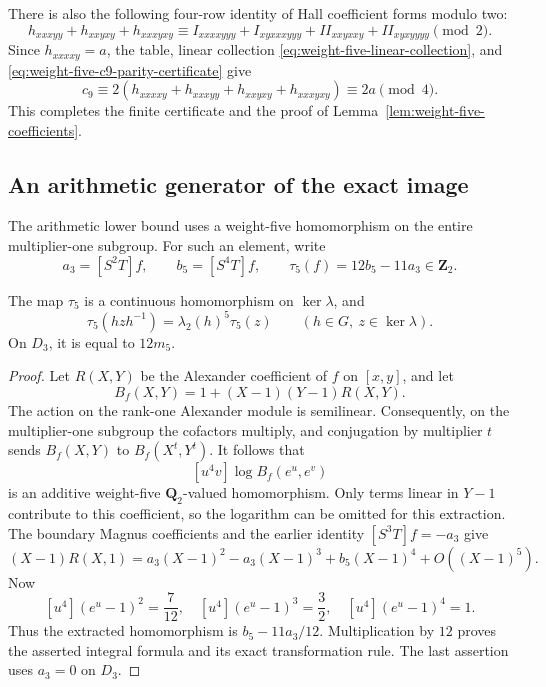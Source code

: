 There is also the following four-row identity of Hall coefficient
forms modulo two:
\begin{equation}\label{eq:weight-five-c9-parity-certificate}
 h_{xxxyy}+h_{xxyxy}+h_{xxxyxy}
 \equiv I_{xxxxyyy}+I_{xyxxxyyy}+II_{xxyxxy}+II_{xyxyyyy}
 \pmod2.
\end{equation}
Since $h_{xxxxy}=a$, the table, linear collection
\eqref{eq:weight-five-linear-collection}, and
\eqref{eq:weight-five-c9-parity-certificate} give
\[
 c_9\equiv
 2(h_{xxxxy}+h_{xxxyy}+h_{xxyxy}+h_{xxxyxy})
 \equiv2a\pmod4.
\]
This completes the finite certificate and the proof of
Lemma~\ref{lem:weight-five-coefficients}.

\subsection{An arithmetic generator of the exact image}

The arithmetic lower bound uses a weight-five homomorphism on
the entire multiplier-one subgroup.  For such an element, write
\[
 a_3=[S^2T]f,\qquad b_5=[S^4T]f,
 \qquad \tau_5(f)=12b_5-11a_3\in\mathbf Z_2.
\]

\begin{lemma}\label{lem:tau-five}
The map $\tau_5$ is a continuous homomorphism on $\ker\lambda$,
and
\[
 \tau_5(hzh^{-1})=\lambda_2(h)^5\tau_5(z)
 \qquad(h\in G,\ z\in\ker\lambda).
\]
On $D_3$, it is equal to $12m_5$.
\end{lemma}

\begin{proof}
Let $R(X,Y)$ be the Alexander coefficient of $f$ on $[x,y]$,
and let
\[
 B_f(X,Y)=1+(X-1)(Y-1)R(X,Y).
\]
The action on the rank-one Alexander module is semilinear.
Consequently, on the multiplier-one subgroup the cofactors
multiply, and conjugation by multiplier $t$ sends $B_f(X,Y)$
to $B_f(X^t,Y^t)$.  It follows that
\[
 [u^4v]\log B_f(e^u,e^v)
\]
is an additive weight-five $\mathbf Q_2$-valued homomorphism.
Only terms linear in $Y-1$ contribute to this coefficient, so
the logarithm can be omitted for this extraction.  The boundary
Magnus coefficients and the earlier identity $[S^3T]f=-a_3$ give
\[
 (X-1)R(X,1)
 =a_3(X-1)^2-a_3(X-1)^3+b_5(X-1)^4+O((X-1)^5).
\]
Now
\[
 [u^4](e^u-1)^2=\frac7{12},\quad
 [u^4](e^u-1)^3=\frac32,\quad
 [u^4](e^u-1)^4=1.
\]
Thus the extracted homomorphism is $b_5-11a_3/12$.
Multiplication by $12$ proves the asserted integral formula
and its exact transformation rule.  The last assertion uses
$a_3=0$ on $D_3$.
\end{proof}

